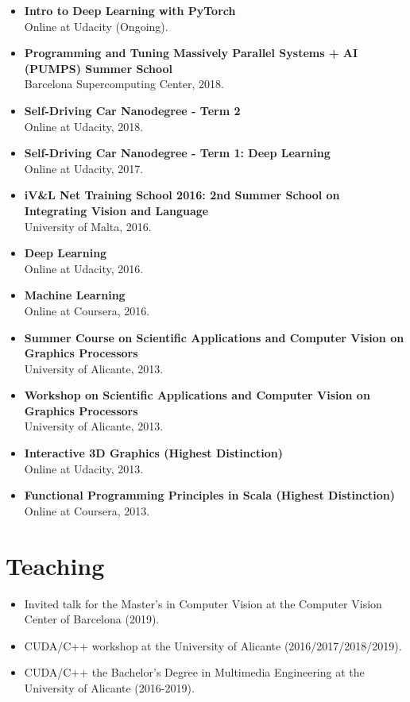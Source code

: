 \documentclass[8pt]{article}
\begin{document}
\begin{itemize}
    \item \textbf{Intro to Deep Learning with PyTorch}\\ Online at Udacity (Ongoing).
	\item \textbf{Programming and Tuning Massively Parallel Systems + AI (PUMPS) Summer School}\\ Barcelona Supercomputing Center, 2018.
	\item \textbf{Self-Driving Car Nanodegree - Term 2}\\ Online at Udacity, 2018.
	\item \textbf{Self-Driving Car Nanodegree - Term 1: Deep Learning}\\ Online at Udacity, 2017.
	\item \textbf{iV\&L Net Training School 2016: 2nd Summer School on Integrating Vision and Language}\\ University of Malta, 2016.
	\item \textbf{Deep Learning}\\ Online at Udacity, 2016.
	\item \textbf{Machine Learning}\\ Online at Coursera, 2016.
	\item \textbf{Summer Course on Scientific Applications and Computer Vision on Graphics Processors}\\ University of Alicante, 2013.
	\item \textbf{Workshop on Scientific Applications and Computer Vision on Graphics Processors}\\ University of Alicante, 2013.	
	\item \textbf{Interactive 3D Graphics (Highest Distinction)}\\
	Online at Udacity, 2013.
	\item \textbf{Functional Programming Principles in Scala (Highest Distinction)}\\
	Online at Coursera, 2013.
\end{itemize}

\section*{Teaching}

\begin{itemize}
    \item Invited talk for the Master's in Computer Vision at the Computer Vision Center of Barcelona (2019).
    \item CUDA/C++ workshop at the University of Alicante (2016/2017/2018/2019).
    \item CUDA/C++ the Bachelor's Degree in Multimedia Engineering at the University of Alicante (2016-2019).
\end{itemize}
\end{document}
